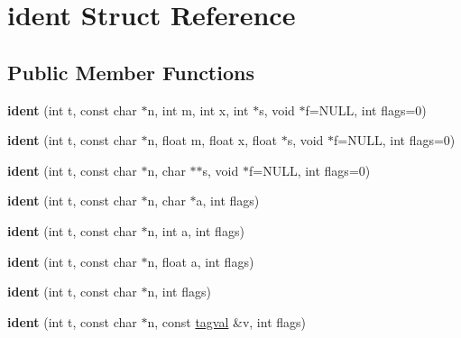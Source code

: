 \hypertarget{structident}{}\section{ident Struct Reference}
\label{structident}
\subsection*{Public Member Functions}
\begin{DoxyCompactItemize}
\item 
\mbox{\label{structident_aed8235d056f71c15a2c80fac76e396f7}} 
{\bfseries ident} (int t, const char $\ast$n, int m, int x, int $\ast$s, void $\ast$f=N\+U\+LL, int flags=0)
\item 
\mbox{\label{structident_aee755c48ba698470423295660ca13c09}} 
{\bfseries ident} (int t, const char $\ast$n, float m, float x, float $\ast$s, void $\ast$f=N\+U\+LL, int flags=0)
\item 
\mbox{\label{structident_a6cdba7cea1decd2b8790ebad42bc148b}} 
{\bfseries ident} (int t, const char $\ast$n, char $\ast$$\ast$s, void $\ast$f=N\+U\+LL, int flags=0)
\item 
\mbox{\label{structident_a688f3403b66806f95638c925f5afe86f}} 
{\bfseries ident} (int t, const char $\ast$n, char $\ast$a, int flags)
\item 
\mbox{\label{structident_af9c556cc1a34d2cbe8770cdf54ebb5b7}} 
{\bfseries ident} (int t, const char $\ast$n, int a, int flags)
\item 
\mbox{\label{structident_a43de4850c38c08928eea93b4c986c69b}} 
{\bfseries ident} (int t, const char $\ast$n, float a, int flags)
\item 
\mbox{\label{structident_a38f2de1252ef46f06e817d06d0de0136}} 
{\bfseries ident} (int t, const char $\ast$n, int flags)
\item 
\mbox{\label{structident_ac680cb604154989900b58f26821113e8}} 
{\bfseries ident} (int t, const char $\ast$n, const \hyperlink{structtagval}{tagval} \&v, int flags)
\item 
$$
\end{DoxyCompactItemize}
